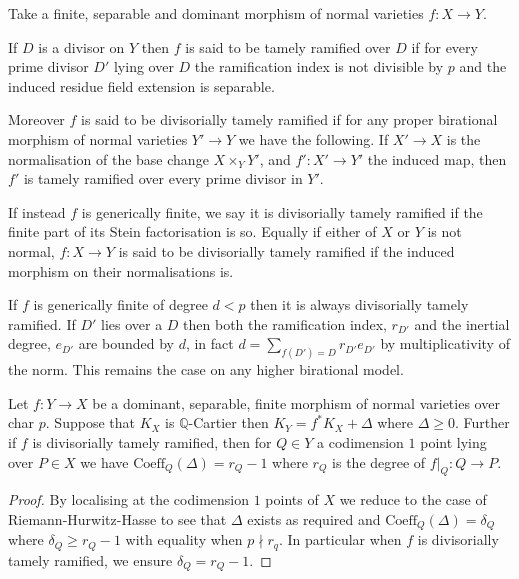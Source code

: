 \begin{definition}
	Take a finite, separable and dominant morphism of normal varieties $f\colon X \to Y$.
	
	If $D$ is a divisor on $Y$ then $f$ is said to be tamely ramified over $D$ if for every prime divisor $D'$ lying over $D$ the ramification index is not divisible by $p$ and the induced residue field extension is separable.
	
	Moreover $f$ is said to be divisorially tamely ramified if for any proper birational morphism of normal varieties $Y' \to Y$ we have the following. If $X' \to X$ is the normalisation of the base change $X\times_{Y}Y'$, and $f'\colon X'\to Y'$  the induced map, then $f'$ is tamely ramified over every prime divisor in $Y'$.
	
	If instead $f$ is generically finite, we say it is divisorially tamely ramified if the finite part of its Stein factorisation is so. Equally if either of $X$ or $Y$ is not normal, $f\colon X \to Y$ is said to be divisorially tamely ramified if the induced morphism on their normalisations is.
\end{definition}

If $f$ is generically finite of degree $d <p$ then it is always divisorially tamely ramified. If $D'$ lies over a $D$ then both the ramification index, $r_{D'}$ and the inertial degree, $e_{D'}$ are bounded by $d$, in fact $d= \sum_{f(D')=D} r_{D'}e_{D'}$ by multiplicativity of the norm. This remains the case on any higher birational model.

\begin{lemma}
	Let $f\colon Y \to X$ be a dominant, separable, finite morphism of normal varieties over char $p$. Suppose that $K_{X}$ is $\mathbb{Q}$-Cartier then $K_{Y}=f^{*}K_{X}+\Delta$ where $\Delta \geq 0$. Further if $f$ is divisorially tamely ramified, then for $Q \in Y$ a codimension $1$ point lying over $P \in X$ we have $\text{Coeff}_{Q}(\Delta)=r_{Q}-1$ where $r_{Q}$ is the degree of $f|_{Q}\colon Q \to P$.
\end{lemma}
\begin{proof}
	By localising at the codimension $1$ points of $X$ we reduce to the case of Riemann-Hurwitz-Hasse to see that $\Delta$ exists as required and $\text{Coeff}_{Q}(\Delta)=\delta_{Q}$ where $\delta_{Q} \geq r_{Q}-1$ with equality when $p\nmid r_{q}$. In particular when $f$ is divisorially tamely ramified, we ensure $\delta_{Q}=r_{Q}-1$.
\end{proof}

